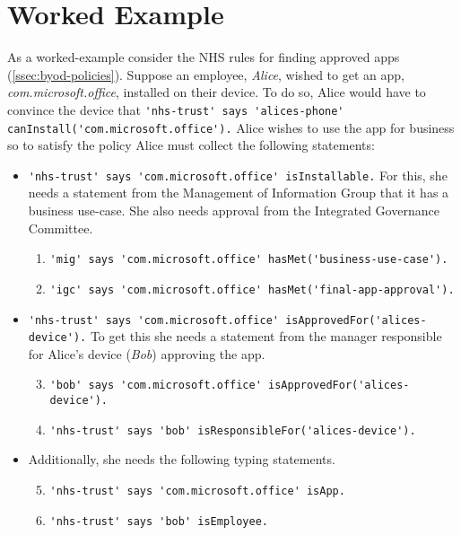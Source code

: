 \documentclass{llncs}
\begin{document}
\section{Worked Example}

As a worked-example consider the NHS rules for finding approved apps (\autoref{ssec:byod-policies}).
Suppose an employee, \emph{Alice}, wished to get an app, \emph{\ttfamily com.microsoft.office}, installed on their device.
To do so, Alice would have to convince the device that \lstinline{'nhs-trust' says 'alices-phone' canInstall('com.microsoft.office').}
Alice wishes to use the app for business so to satisfy the policy Alice must collect the following statements:
\begin{itemize}
    \newcommand{\weitemsize}[0]{\footnotesize}
  \item {\weitemsize \lstinline{'nhs-trust' says 'com.microsoft.office' isInstallable.}\newline}
    For this, she needs a statement from the Management of Information Group that it has a business use-case.
    She also needs approval from the Integrated Governance Committee.
    \begin{enumerate}\setcounter{enumi}{0}
      \item {\weitemsize \lstinline{'mig' says 'com.microsoft.office' hasMet('business-use-case').}}
      \item {\weitemsize \lstinline{'igc' says 'com.microsoft.office' hasMet('final-app-approval').}}
    \end{enumerate}
  \item {\weitemsize \lstinline{'nhs-trust' says 'com.microsoft.office' isApprovedFor('alices-device').}}
    To get this she needs a statement from the manager responsible for Alice's device (\emph{Bob}) approving the app.
    \begin{enumerate}\setcounter{enumi}{2}
      \item {\weitemsize \lstinline{'bob' says 'com.microsoft.office' isApprovedFor('alices-device').}}
      \item {\weitemsize \lstinline{'nhs-trust' says 'bob' isResponsibleFor('alices-device').}}
    \end{enumerate}
  \item Additionally, she needs the following typing statements.
    \begin{enumerate}\setcounter{enumi}{4}
      \item {\weitemsize \lstinline{'nhs-trust' says 'com.microsoft.office' isApp.}} \label{item:isapp}
      \item {\weitemsize \lstinline{'nhs-trust' says 'bob' isEmployee.}}
    \end{enumerate}
\end{itemize}
\end{document}
